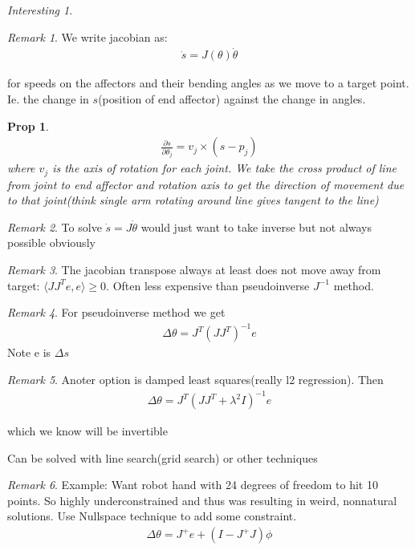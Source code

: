 \documentclass[11pt]{article}
\newtheorem{prop}{Prop}
\theoremstyle{remark}
\newtheorem{remark}{Remark}
\newtheorem{interest}{Interesting}
\begin{document}
\begin{interest}
\begin{remark}
	We write jacobian as:
	\begin{align*}
		\dot{s} = J(\theta)\dot{\theta}
	\end{align*}

	for speeds on the affectors and their bending angles as we move to a target point. Ie. the change in $s$(position of end affector) against the change in angles.
\end{remark}

\begin{prop}
	\begin{align*}
		\frac{\partial s}{\partial \theta_j} = v_j \times (s - p_j)
	\end{align*}
	where $v_j$ is the axis of rotation for each joint. We take the cross product of line from joint to end affector and rotation axis to get the direction of movement due to that joint(think single arm rotating around line gives tangent to the line)
\end{prop}

\begin{remark}
	To solve $\dot{s} = J\dot{\theta}$ would just want to take inverse but not always possible obviously
\end{remark}

\begin{remark}
	The jacobian transpose always at least does not move away from target: $\langle  J J^T e, e \rangle \geq0$. Often less expensive than pseudoinverse $J^{-1}$ method. 
\end{remark}

\begin{remark}
	For pseudoinverse method we get
	\begin{align*}
		\Delta\theta = J^T(JJ^T)^{-1}e
	\end{align*}
	Note e is $\Delta s$
\end{remark}

\begin{remark}
	Anoter option is damped least squares(really l2 regression). Then
	\begin{align*}
		\Delta \theta = J^T(JJ^T + \lambda^2I)^{-1}e
	\end{align*}

	which we know will be invertible

	Can be solved with line search(grid search) or other techniques
\end{remark}

\begin{remark}
	Example: Want robot hand with 24 degrees of freedom to hit 10 points. So highly underconstrained and thus was resulting in weird, nonnatural solutions. Use Nullspace technique to add some constraint.
	\begin{align*}
		\Delta \theta = J^+e+ (I-J^+J)\phi
	\end{align*}


\end{remark}
\end{interest}
\end{document}
